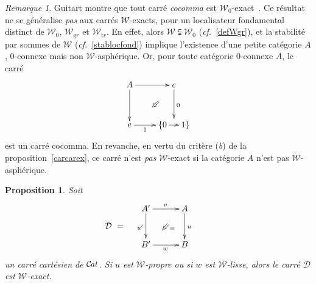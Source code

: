 \documentclass[francais]{smfart}
\theoremstyle{plain}
\newtheorem{prop}[thm]{Proposition}
\theoremstyle{remark}
\newtheorem{rem}[thm]{Remarque}
\theoremstyle{definition}
\numberwithin{equation}{thm}
\begin{document}
\begin{rem}
Guitart montre que tout carré \emph{cocomma} est ${{\mathcal{W}}_{0}}${\nobreakdash}-exact~\cite{Guit1}. Ce résultat ne se généralise \emph{pas} aux carrés ${\mathcal{W}}${\nobreakdash}-exacts, pour un localisateur fondamental distinct de ${{\mathcal{W}}_{0}}$, ${{\mathcal{W}}_{\mathrm gr}}$ et ${{\mathcal{W}}_{\mathrm tr}}$. En effet, alors ${\mathcal{W}}\subsetneqq{{\mathcal{W}}_{0}}$ ({\emph{cf.}}~\ref{defWgr}), et la stabilité par sommes de ${\mathcal{W}}$ ({\emph{cf.}}~\ref{stablocfond}) implique l'existence d'une petite catégorie $A$, $0${\nobreakdash}-connexe mais non ${\mathcal{W}}${\nobreakdash}-asphérique. Or, pour toute catégorie $0${\nobreakdash}-connexe $A$, le carré 
\[
\UseAllTwocells
\xymatrixcolsep{.0pc}
\xymatrixrowsep{.3pc}
\xymatrix{
A\ar[dddd]_{}\ar[rrrrrr]^{}
&&&&&&e\ar[dddd]^{0}
\\&&&
\ddrrcompositemap<\omit>{}
&&&
\\&&&&&&
\\&&&&&&
\\
e\ar[rrrrr]_-{1}
&&&&&\{0\ar[rr]
&{\phantom{\}}}
&1\}
}
\]
est un carré cocomma. En revanche, en vertu du critère (\emph{b}) de la proposition~\ref{carcarex}, ce carré n'est \emph{pas} ${\mathcal{W}}${\nobreakdash}-exact si la catégorie $A$ n'est pas ${\mathcal{W}}${\nobreakdash}-asphérique.
\end{rem}

\begin{prop} \label{proprelisseex}
Soit
\[
\mathcal{D}\ =\quad
\raise 23pt
\vbox{
\UseTwocells
\xymatrixcolsep{2.5pc}
\xymatrixrowsep{2.4pc}
\xymatrix{
A'\ar[d]_{u'}\ar[r]^{v}
\drtwocell<\omit>{}
&A\ar[d]^{u}\ar@<-2ex>@{}[d]_(.55){=}
\\
B'\ar[r]_{w}
&B
}
}\qquad
\]
un carré cartésien de ${{\mathcal{C} \mspace{-2.mu} \it{at}}}$. Si $u$ est ${\mathcal{W}}$-propre ou si $w$ est ${\mathcal{W}}${\nobreakdash}-lisse, alors le carré $\mathcal D$ est ${\mathcal{W}}${\nobreakdash}-exact.
\end{prop}
\end{document}
